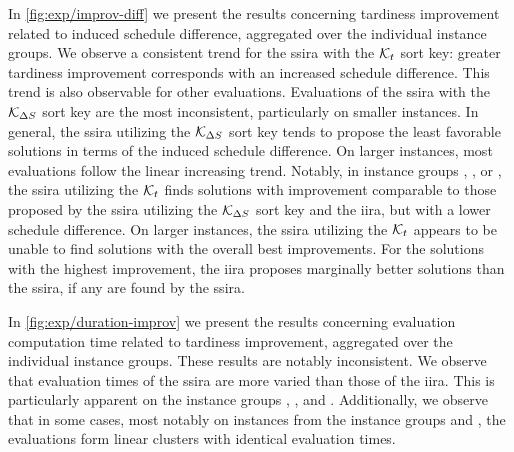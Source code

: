 In \cref{fig:exp/improv-diff} we present the results concerning
tardiness improvement related to induced schedule difference, aggregated over the individual instance groups.
We observe a consistent trend for the \ac{ssira} with the $\mathcal{K}_{t}$ sort key:
greater tardiness improvement corresponds with an increased schedule difference.
This trend is also observable for other evaluations.
Evaluations of the \ac{ssira} with the $\mathcal{K}_{\Delta S_{}}$ sort key are the most inconsistent,
particularly on smaller instances.
In general, the \ac{ssira} utilizing the $\mathcal{K}_{\Delta S_{}}$ sort key tends to propose
the least favorable solutions in terms of the induced schedule difference.
On larger instances, most evaluations follow the linear increasing trend.
Notably, in instance groups , , or ,
the \ac{ssira} utilizing the $\mathcal{K}_{t}$ finds solutions with improvement comparable
to those proposed by the \ac{ssira} utilizing the $\mathcal{K}_{\Delta S_{}}$ sort key
and the \ac{iira},
but with a lower schedule difference.
On larger instances, the \ac{ssira} utilizing the $\mathcal{K}_{t}$ appears to be unable to find
solutions with the overall best improvements.
For the solutions with the highest improvement,
the \ac{iira} proposes marginally better solutions than the \ac{ssira},
if any are found by the \ac{ssira}.

In \cref{fig:exp/duration-improv} we present the results concerning
evaluation computation time related to tardiness improvement, aggregated over the individual instance groups.
These results are notably inconsistent.
We observe that evaluation times of the \ac{ssira} are more varied than those of the \ac{iira}.
This is particularly apparent on the instance groups , , and .
Additionally, we observe that in some cases,
most notably on instances from the instance groups  and ,
the evaluations form linear clusters with identical evaluation times.

